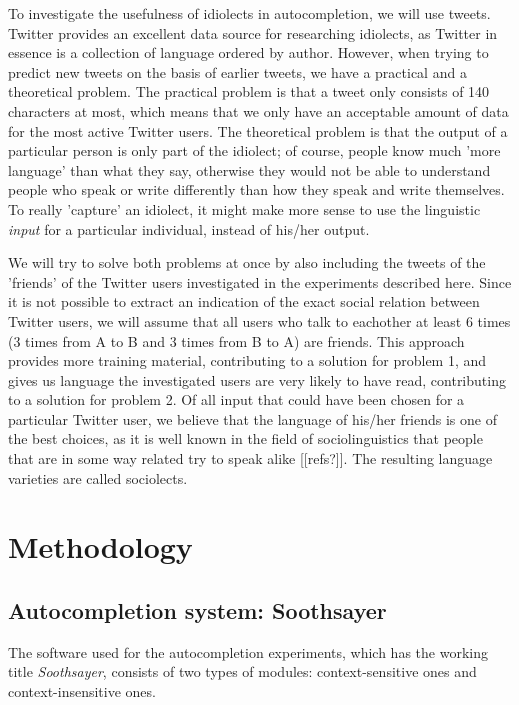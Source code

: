 \documentclass[11pt]{article}
\begin{document}
To investigate the usefulness of idiolects in autocompletion, we will use tweets. Twitter provides an excellent data source for researching idiolects, as Twitter in essence is a collection of language ordered by author. However, when trying to predict new tweets on the basis of earlier tweets, we have a practical and a theoretical problem. The practical problem is that a tweet only consists of 140 characters at most, which means that we only have an acceptable amount of data for the most active Twitter users. The theoretical problem is that the output of a particular person is only part of the idiolect; of course, people know much 'more language' than what they say, otherwise they would not be able to understand people who speak or write differently than how they speak and write themselves. To really 'capture' an idiolect, it might make more sense to use the linguistic \emph{input} for a particular individual, instead of his/her output.

We will try to solve both problems at once by also including the tweets of the 'friends' of the Twitter users investigated in the experiments described here. Since it is not possible to extract an indication of the exact social relation between Twitter users, we will assume that all users who talk to eachother at least 6 times (3 times from A to B and 3 times from B to A) are friends. This approach provides more training material, contributing to a solution for problem 1, and gives us language the investigated users are very likely to have read, contributing to a solution for problem 2. Of all input that could have been chosen for a particular Twitter user, we believe that the language of his/her friends is one of the best choices, as it is well known in the field of sociolinguistics that people that are in some way related try to speak alike [[refs?]]. The resulting language varieties are called sociolects.

\section{Methodology}

\subsection{Autocompletion system: Soothsayer}

The software used for the autocompletion experiments, which has the working title \emph{Soothsayer}, consists of two types of modules: context-sensitive ones and context-insensitive ones. 
\end{document}
